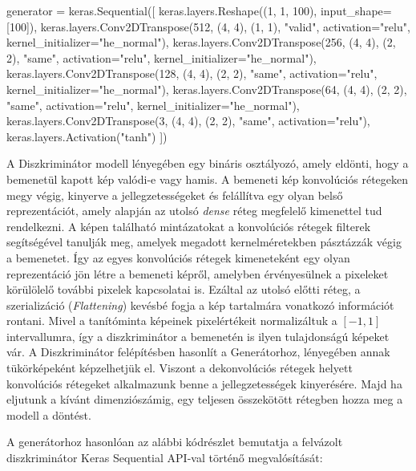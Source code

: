 \begin{python}
generator = keras.Sequential([
    keras.layers.Reshape((1, 1, 100), input_shape=[100]),
    keras.layers.Conv2DTranspose(512, (4, 4), (1, 1), "valid",
                                 activation="relu",
                                 kernel_initializer="he_normal"),
    keras.layers.Conv2DTranspose(256, (4, 4), (2, 2), "same",
                                 activation="relu",
                                 kernel_initializer="he_normal"),
    keras.layers.Conv2DTranspose(128, (4, 4), (2, 2), "same",
                                 activation="relu",
                                 kernel_initializer="he_normal"),
    keras.layers.Conv2DTranspose(64, (4, 4), (2, 2), "same",
                                 activation="relu",
                                 kernel_initializer="he_normal"),
    keras.layers.Conv2DTranspose(3, (4, 4), (2, 2), "same",
                                 activation="relu"),
    keras.layers.Activation("tanh")
])
\end{python}



A Diszkriminátor modell lényegében egy bináris osztályozó, amely eldönti, hogy a bemenetül kapott kép valódi-e vagy hamis. A bemeneti kép konvolúciós rétegeken megy végig, kinyerve a jellegzetességeket és felállítva egy olyan belső reprezentációt, amely alapján az utolsó \textit{dense} réteg megfelelő kimenettel tud rendelkezni. A képen található mintázatokat a konvolúciós rétegek filterek segítségével tanulják meg, amelyek megadott kernelméretekben pásztázzák végig a bemenetet. Így az egyes konvolúciós rétegek kimeneteként egy olyan reprezentáció jön létre a bemeneti képről, amelyben érvényesülnek a pixeleket körülölelő további pixelek kapcsolatai is. Ezáltal az utolsó előtti réteg, a szerializáció (\textit{Flattening}) kevésbé fogja a kép tartalmára vonatkozó információt rontani. Mivel a tanítóminta képeinek pixelértékeit normalizáltuk a $[-1, 1]$ intervallumra, így a diszkriminátor a bemenetén is ilyen tulajdonságú képeket vár. A Diszkriminátor felépítésben hasonlít a Generátorhoz, lényegében annak tükörképeként képzelhetjük el. Viszont a dekonvolúciós rétegek helyett konvolúciós rétegeket alkalmazunk benne a jellegzetességek kinyerésére. Majd ha eljutunk a kívánt dimenziószámig, egy teljesen összekötött rétegben hozza meg a modell a döntést.

A generátorhoz hasonlóan az alábbi kódrészlet bemutatja a felvázolt diszkriminátor Keras Sequential API-val történő megvalósítását:

